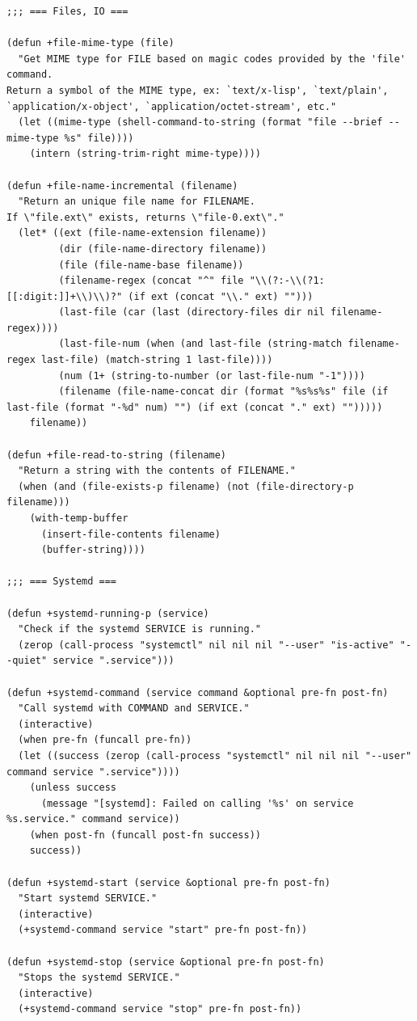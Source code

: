 \documentclass[11pt]{article}
\begin{document}
\begin{verbatim}
;;; === Files, IO ===

(defun +file-mime-type (file)
  "Get MIME type for FILE based on magic codes provided by the 'file' command.
Return a symbol of the MIME type, ex: `text/x-lisp', `text/plain',
`application/x-object', `application/octet-stream', etc."
  (let ((mime-type (shell-command-to-string (format "file --brief --mime-type %s" file))))
    (intern (string-trim-right mime-type))))

(defun +file-name-incremental (filename)
  "Return an unique file name for FILENAME.
If \"file.ext\" exists, returns \"file-0.ext\"."
  (let* ((ext (file-name-extension filename))
         (dir (file-name-directory filename))
         (file (file-name-base filename))
         (filename-regex (concat "^" file "\\(?:-\\(?1:[[:digit:]]+\\)\\)?" (if ext (concat "\\." ext) "")))
         (last-file (car (last (directory-files dir nil filename-regex))))
         (last-file-num (when (and last-file (string-match filename-regex last-file) (match-string 1 last-file))))
         (num (1+ (string-to-number (or last-file-num "-1"))))
         (filename (file-name-concat dir (format "%s%s%s" file (if last-file (format "-%d" num) "") (if ext (concat "." ext) "")))))
    filename))

(defun +file-read-to-string (filename)
  "Return a string with the contents of FILENAME."
  (when (and (file-exists-p filename) (not (file-directory-p filename)))
    (with-temp-buffer
      (insert-file-contents filename)
      (buffer-string))))

;;; === Systemd ===

(defun +systemd-running-p (service)
  "Check if the systemd SERVICE is running."
  (zerop (call-process "systemctl" nil nil nil "--user" "is-active" "--quiet" service ".service")))

(defun +systemd-command (service command &optional pre-fn post-fn)
  "Call systemd with COMMAND and SERVICE."
  (interactive)
  (when pre-fn (funcall pre-fn))
  (let ((success (zerop (call-process "systemctl" nil nil nil "--user" command service ".service"))))
    (unless success
      (message "[systemd]: Failed on calling '%s' on service %s.service." command service))
    (when post-fn (funcall post-fn success))
    success))

(defun +systemd-start (service &optional pre-fn post-fn)
  "Start systemd SERVICE."
  (interactive)
  (+systemd-command service "start" pre-fn post-fn))

(defun +systemd-stop (service &optional pre-fn post-fn)
  "Stops the systemd SERVICE."
  (interactive)
  (+systemd-command service "stop" pre-fn post-fn))
\end{verbatim}
\end{document}
